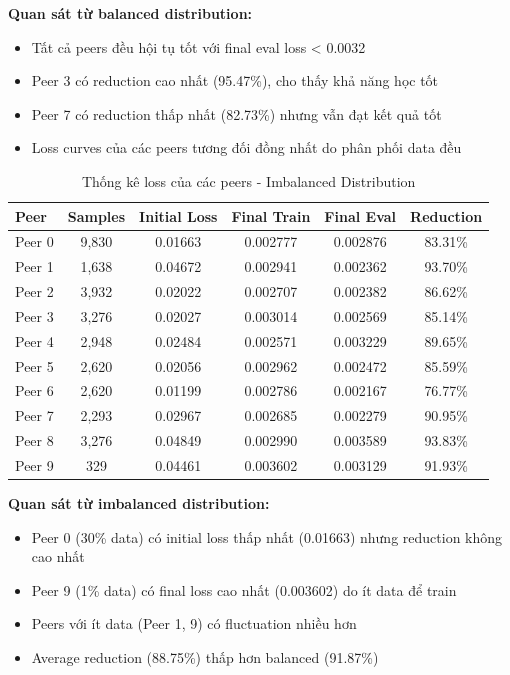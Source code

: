 \textbf{Quan sát từ balanced distribution:}
\begin{itemize}
    \item Tất cả peers đều hội tụ tốt với final eval loss < 0.0032
    \item Peer 3 có reduction cao nhất (95.47\%), cho thấy khả năng học tốt
    \item Peer 7 có reduction thấp nhất (82.73\%) nhưng vẫn đạt kết quả tốt
    \item Loss curves của các peers tương đối đồng nhất do phân phối data đều
\end{itemize}

\begin{table}[H]
\centering
\caption{Thống kê loss của các peers - Imbalanced Distribution}
\begin{tabular}{lccccc}
\toprule
\textbf{Peer} & \textbf{Samples} & \textbf{Initial Loss} & \textbf{Final Train} & \textbf{Final Eval} & \textbf{Reduction} \\
\midrule
Peer 0 & 9,830 & 0.01663 & 0.002777 & 0.002876 & 83.31\% \\
Peer 1 & 1,638 & 0.04672 & 0.002941 & 0.002362 & 93.70\% \\
Peer 2 & 3,932 & 0.02022 & 0.002707 & 0.002382 & 86.62\% \\
Peer 3 & 3,276 & 0.02027 & 0.003014 & 0.002569 & 85.14\% \\
Peer 4 & 2,948 & 0.02484 & 0.002571 & 0.003229 & 89.65\% \\
Peer 5 & 2,620 & 0.02056 & 0.002962 & 0.002472 & 85.59\% \\
Peer 6 & 2,620 & 0.01199 & 0.002786 & 0.002167 & 76.77\% \\
Peer 7 & 2,293 & 0.02967 & 0.002685 & 0.002279 & 90.95\% \\
Peer 8 & 3,276 & 0.04849 & 0.002990 & 0.003589 & 93.83\% \\
Peer 9 & 329 & 0.04461 & 0.003602 & 0.003129 & 91.93\% \\
\bottomrule
\end{tabular}
\end{table}

\textbf{Quan sát từ imbalanced distribution:}
\begin{itemize}
    \item Peer 0 (30\% data) có initial loss thấp nhất (0.01663) nhưng reduction không cao nhất
    \item Peer 9 (1\% data) có final loss cao nhất (0.003602) do ít data để train
    \item Peers với ít data (Peer 1, 9) có fluctuation nhiều hơn
    \item Average reduction (88.75\%) thấp hơn balanced (91.87\%)
\end{itemize}

